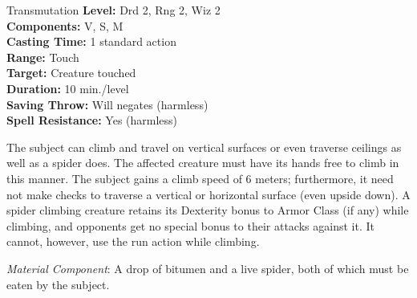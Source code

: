 {Transmutation}
{
	\textbf{Level:}
	Drd 2, Rng 2, Wiz 2\\
	\textbf{Components:}
	V, S, M\\
	\textbf{Casting Time:}
	1 standard action\\
	\textbf{Range:}
	Touch\\
	\textbf{Target:}
	Creature touched\\
	\textbf{Duration:}
	10 min./level\\
	\textbf{Saving Throw:}
	Will negates (harmless)\\
	\textbf{Spell Resistance:}
	Yes (harmless)\\
}
{
	The subject can climb and travel on vertical surfaces or even traverse ceilings as well as a spider does. The affected creature must have its hands free to climb in this manner. The subject gains a climb speed of 6 meters; furthermore, it need not make  checks to traverse a vertical or horizontal surface (even upside down). A spider climbing creature retains its Dexterity bonus to Armor Class (if any) while climbing, and opponents get no special bonus to their attacks against it. It cannot, however, use the run action while climbing.

	\textit{Material Component}:
	A drop of bitumen and a live spider, both of which must be eaten by the subject.

}
